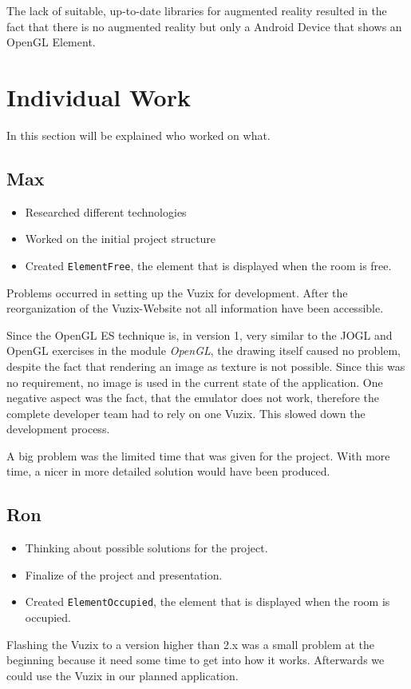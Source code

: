 \documentclass[11pt]{scrartcl}
\begin{document}
\begin{multicols}{2}
		The lack of suitable, up-to-date libraries for augmented reality resulted in the fact that there is no augmented reality but only a Android Device that shows an OpenGL Element.  

	\section{Individual Work}
		In this section will be explained who worked on what.
		\subsection{Max}
			\begin{itemize}
				\item Researched different technologies
				\item Worked on the initial project structure
				\item Created \texttt{ElementFree}, the element that is displayed when the room is free.
			\end{itemize}
			 Problems occurred in setting up the Vuzix for development. After the reorganization of the Vuzix-Website not all information have been accessible.
			 
			 Since the OpenGL ES technique is, in version 1, very similar to the JOGL and OpenGL exercises in the module \emph{OpenGL}, the drawing itself caused no problem, despite the fact that rendering an image as texture is not possible. Since this was no requirement, no image is used in the current state of the application.  One negative aspect was the fact, that the emulator does not work, therefore the complete developer team had to rely on one Vuzix. This slowed down the development process.
			 
			 A big problem was the limited time that was given for the project.  With more time, a nicer in more detailed solution would have been produced.
		\subsection{Ron}
			\begin{itemize}
				\item Thinking about possible solutions for the project.
				\item Finalize of the project and presentation.
				\item Created \texttt{ElementOccupied}, the element that is displayed when the room is occupied.
			\end{itemize}
			Flashing the Vuzix to a version higher than 2.x was a small problem at the beginning because it need some time to get into how it works. Afterwards we could use the Vuzix in our planned application.
			

\end{multicols}
\end{document}
